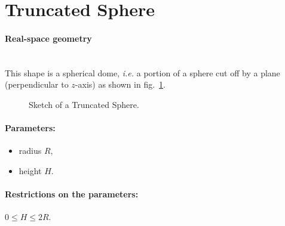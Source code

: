 \section{Truncated Sphere}
  
\paragraph{Real-space geometry}\mbox{}\\
This shape is a spherical dome, \textit{i.e.} a portion of a sphere cut off by a plane (perpendicular
to $z$-axis) as shown in fig.~\ref{fig:sphere}.

\begin{figure}[ht]
\hfill
{}
\hfill
{}
\hfill
\caption{Sketch of a Truncated Sphere.}
\label{fig:sphere}
\end{figure}
\FloatBarrier

\paragraph{Parameters:}
\begin{itemize}
\item radius $R$,
\item height $H$.
\end{itemize}

\paragraph{Restrictions on the parameters:} $0 \leq H\leq 2R$.

